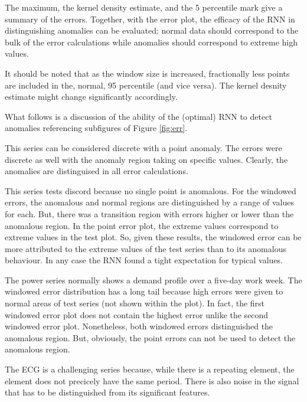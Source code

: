 The maximum, the kernel density estimate, and the 5 percentile mark give a summary of the errors.
%
Together, with the error plot, the efficacy of the RNN in distinguishing anomalies can be evaluated;
%
normal data should correspond to the bulk of the error calculations while anomalies should correspond to extreme high values.


It should be noted that as the window size is increased, fractionally less points are included in the, normal, 95 percentile (and vice versa).
%
The kernel desnity estimate might change significantly accordingly.


What follows is a discussion of the ability of the (optimal) RNN to detect anomalies referencing subfigures of Figure \ref{fig:err}.



This series can be considered discrete with a point anomaly.
%
The errors were discrete as well with the anomaly region taking on specific values.
%
Clearly, the anomalies are distinguised in all error calculations.



This series tests discord because no single point is anomalous.
%
For the windowed errors, the anomalous and normal regions are distinguished by a range of values for each.
%
But, there was a transition region with errors higher or lower than the anomalous region.
%
In the point error plot, the extreme values correspond to extreme values in the test plot.
%
So, given these results, the windowed error can be more attributed to the extreme values of the test series than to its anomalous behaviour.
%
In any case the RNN found a tight expectation for typical values.


The power series normally shows a demand profile over a five-day work week.
%
The windowed error distribution has a long tail because high errors were given to normal areas of test series (not shown within the plot).
%
In fact, the first windowed error plot does not contain the highest error unlike the second windowed error plot.
%
Nonetheless, both windowed errors distinguished the anomalous region.
%
But, obviously, the point errors can not be used to detect the anomalous region.



The ECG is a challenging series because, while there is a repeating element, the element does not precicely have the same period.
%
There is also noise in the signal that has to be distinguished from its significant features.

